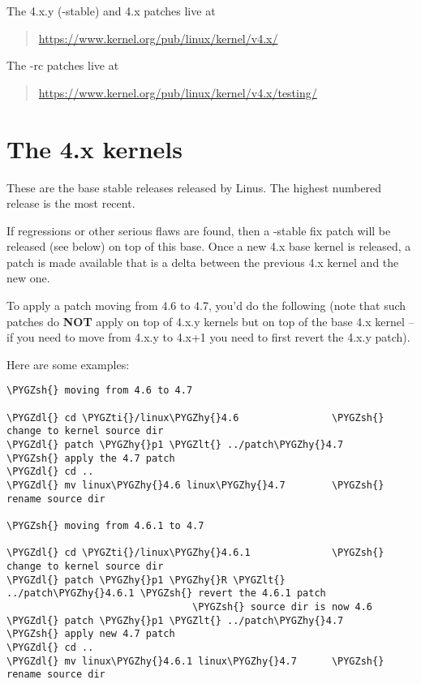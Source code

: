 \documentclass[a4paper,8pt,english]{sphinxmanual}
\def\PYGZlt{\char`\<}
\def\PYGZsh{\char`\#}
\def\PYGZdl{\char`\$}
\def\PYGZhy{\char`\-}
\def\PYGZti{\char`\~}
\begin{document}
The 4.x.y (-stable) and 4.x patches live at
\begin{quote}

\href{https://www.kernel.org/pub/linux/kernel/v4.x/}{https://www.kernel.org/pub/linux/kernel/v4.x/}
\end{quote}

The -rc patches live at
\begin{quote}

\href{https://www.kernel.org/pub/linux/kernel/v4.x/testing/}{https://www.kernel.org/pub/linux/kernel/v4.x/testing/}
\end{quote}


\section{The 4.x kernels}
\label{process/applying-patches:the-4-x-kernels}
These are the base stable releases released by Linus. The highest numbered
release is the most recent.

If regressions or other serious flaws are found, then a -stable fix patch
will be released (see below) on top of this base. Once a new 4.x base
kernel is released, a patch is made available that is a delta between the
previous 4.x kernel and the new one.

To apply a patch moving from 4.6 to 4.7, you'd do the following (note
that such patches do \textbf{NOT} apply on top of 4.x.y kernels but on top of the
base 4.x kernel -- if you need to move from 4.x.y to 4.x+1 you need to
first revert the 4.x.y patch).

Here are some examples:

\begin{Verbatim}[commandchars=\\\{\}]
\PYGZsh{} moving from 4.6 to 4.7

\PYGZdl{} cd \PYGZti{}/linux\PYGZhy{}4.6                \PYGZsh{} change to kernel source dir
\PYGZdl{} patch \PYGZhy{}p1 \PYGZlt{} ../patch\PYGZhy{}4.7      \PYGZsh{} apply the 4.7 patch
\PYGZdl{} cd ..
\PYGZdl{} mv linux\PYGZhy{}4.6 linux\PYGZhy{}4.7        \PYGZsh{} rename source dir

\PYGZsh{} moving from 4.6.1 to 4.7

\PYGZdl{} cd \PYGZti{}/linux\PYGZhy{}4.6.1              \PYGZsh{} change to kernel source dir
\PYGZdl{} patch \PYGZhy{}p1 \PYGZhy{}R \PYGZlt{} ../patch\PYGZhy{}4.6.1 \PYGZsh{} revert the 4.6.1 patch
                                \PYGZsh{} source dir is now 4.6
\PYGZdl{} patch \PYGZhy{}p1 \PYGZlt{} ../patch\PYGZhy{}4.7      \PYGZsh{} apply new 4.7 patch
\PYGZdl{} cd ..
\PYGZdl{} mv linux\PYGZhy{}4.6.1 linux\PYGZhy{}4.7      \PYGZsh{} rename source dir
\end{Verbatim}
\end{document}
